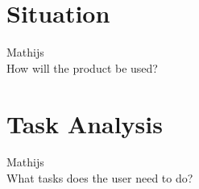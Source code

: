\section{Situation}
	Mathijs\\
	How will the product be used?

\section{Task Analysis}
	Mathijs\\
	What tasks does the user need to do?